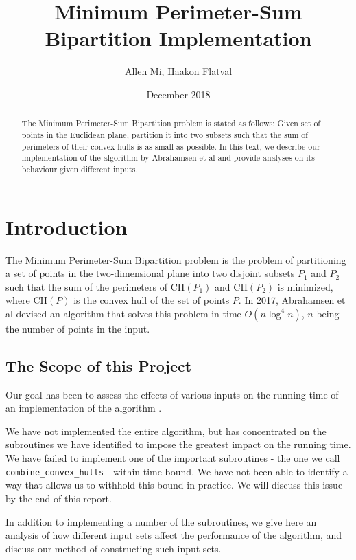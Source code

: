 \documentclass{article}
\title{Minimum Perimeter-Sum Bipartition Implementation}
\author{Allen Mi, Haakon Flatval}
\date{December 2018}
\begin{document}
\maketitle

\begin{abstract}
    The Minimum Perimeter-Sum Bipartition problem is stated as follows: Given set of points in the Euclidean plane, partition it into two subsets such that the sum of perimeters of their convex hulls is as small as possible. In this text, we describe our implementation of the algorithm by Abrahamsen et al \cite{abb17} and provide analyses on its behaviour given different inputs.
\end{abstract}

\section{Introduction}
The Minimum Perimeter-Sum Bipartition problem is the problem of partitioning a set of points in the two-dimensional plane into two disjoint subsets $P_1$ and $P_2$ such that the sum of the perimeters of $\text{CH}(P_1)$ and $\text{CH}(P_2)$ is minimized, where $\text{CH}(P)$ is the convex hull of the set of points $P$. In 2017, Abrahamsen et al \cite{abb17} devised an algorithm that solves this problem in time $O(n \log^4 n)$, $n$ being the number of points in the input. 

\subsection{The Scope of this Project}

Our goal has been to assess the effects of various inputs on the running time of an implementation of the algorithm \cite{abb17}. 

We have not implemented the entire algorithm, but has concentrated on the subroutines we have identified to impose the greatest impact on the running time. 
We have failed to implement one of the important subroutines - the one we call \texttt{combine\_convex\_hulls} - within time bound. We have not been able to identify a way that allows us to withhold this bound in practice. We will discuss this issue by the end of this report.

In addition to implementing a number of the subroutines, we give here an analysis of how different input sets affect the performance of the algorithm, and discuss our method of constructing such input sets.
\end{document}

